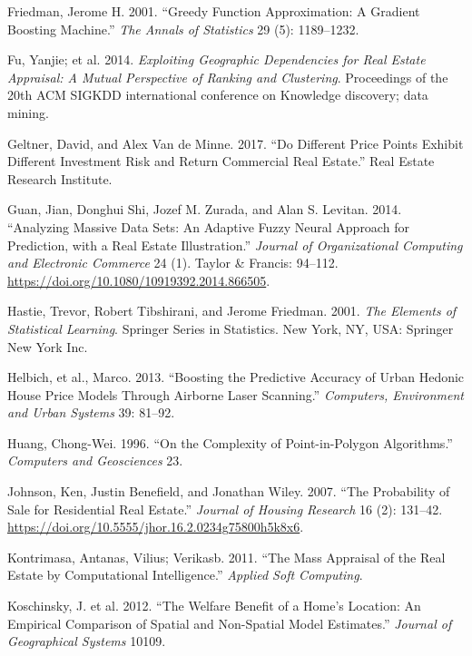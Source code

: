 \documentclass[12pt,]{article}
\begin{document}
\leavevmode\hypertarget{ref-Friedman2001}{}%
Friedman, Jerome H. 2001. ``Greedy Function Approximation: A Gradient
Boosting Machine.'' \emph{The Annals of Statistics} 29 (5): 1189--1232.

\leavevmode\hypertarget{ref-Fu2014}{}%
Fu, Yanjie; et al. 2014. \emph{Exploiting Geographic Dependencies for
Real Estate Appraisal: A Mutual Perspective of Ranking and Clustering}.
Proceedings of the 20th ACM SIGKDD international conference on Knowledge
discovery; data mining.

\leavevmode\hypertarget{ref-Geltner2017}{}%
Geltner, David, and Alex Van de Minne. 2017. ``Do Different Price Points
Exhibit Different Investment Risk and Return Commercial Real Estate.''
Real Estate Research Institute.

\leavevmode\hypertarget{ref-Guan2014}{}%
Guan, Jian, Donghui Shi, Jozef M. Zurada, and Alan S. Levitan. 2014.
``Analyzing Massive Data Sets: An Adaptive Fuzzy Neural Approach for
Prediction, with a Real Estate Illustration.'' \emph{Journal of
Organizational Computing and Electronic Commerce} 24 (1). Taylor \&
Francis: 94--112. \url{https://doi.org/10.1080/10919392.2014.866505}.

\leavevmode\hypertarget{ref-hastie01statisticallearning}{}%
Hastie, Trevor, Robert Tibshirani, and Jerome Friedman. 2001. \emph{The
Elements of Statistical Learning}. Springer Series in Statistics. New
York, NY, USA: Springer New York Inc.

\leavevmode\hypertarget{ref-Helbich2013}{}%
Helbich, et al., Marco. 2013. ``Boosting the Predictive Accuracy of
Urban Hedonic House Price Models Through Airborne Laser Scanning.''
\emph{Computers, Environment and Urban Systems} 39: 81--92.

\leavevmode\hypertarget{ref-Huang1996}{}%
Huang, Chong-Wei. 1996. ``On the Complexity of Point-in-Polygon
Algorithms.'' \emph{Computers and Geosciences} 23.

\leavevmode\hypertarget{ref-Johnson2007}{}%
Johnson, Ken, Justin Benefield, and Jonathan Wiley. 2007. ``The
Probability of Sale for Residential Real Estate.'' \emph{Journal of
Housing Research} 16 (2): 131--42.
\url{https://doi.org/10.5555/jhor.16.2.0234g75800h5k8x6}.

\leavevmode\hypertarget{ref-Kontrimasa2011}{}%
Kontrimasa, Antanas, Vilius; Verikasb. 2011. ``The Mass Appraisal of the
Real Estate by Computational Intelligence.'' \emph{Applied Soft
Computing}.

\leavevmode\hypertarget{ref-Koschinsky2012}{}%
Koschinsky, J. et al. 2012. ``The Welfare Benefit of a Home's Location:
An Empirical Comparison of Spatial and Non-Spatial Model Estimates.''
\emph{Journal of Geographical Systems} 10109.
\end{document}
